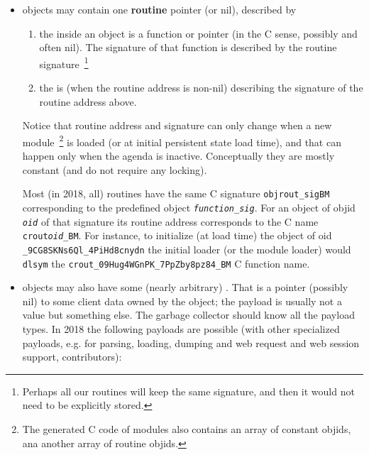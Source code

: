 \begin{itemize}
      \item objects may contain one \textbf{routine} pointer (or nil),
        described by \begin{enumerate}
          
        \item the 
          inside an object is a function or 
          pointer (in the C sense, possibly and often nil). The
          signature of that function is described by the routine
          signature~\footnote{Perhaps all our routines will keep the
            same signature, and then it would not need to be
            explicitly stored.}

        \item the 
          is (when the routine address is non-nil) describing the
          signature of the routine address above.
      \end{enumerate}

      Notice that routine address and signature can only change when
      a new module~\footnote{The generated C code of modules also
        contains an array of constant objids, ana another array of
        routine objids.} is loaded (or at initial persistent state load
      time), and that can happen only when the agenda is
      inactive. Conceptually they are mostly constant (and do not
      require any locking).
        
      Most (in 2018, all) routines have the same C signature
      \texttt{objrout\_sigBM} corresponding to the predefined object
      \texttt{\emph{function\_sig}}. For an object of objid
      \texttt{\emph{oid}} of that signature its routine address
      corresponds to the C name \texttt{crout\emph{oid}\_BM}. For
      instance, to initialize (at load time) the object of oid
      \texttt{\_9CG8SKNs6Ql\_4PiHd8cnydn} the initial loader (or the
      module loader) would \texttt{dlsym} the
      \texttt{crout\_09Hug4WGnPK\_7PpZby8pz84\_BM} C function name.


      \item objects may also have some (nearly arbitrary)
        . That is a pointer (possibly
        nil) to some client data owned by the object; the payload is
        usually not a value but something else. The garbage collector
        should know all the payload types. In 2018 the following
        payloads are possible (with other specialized payloads,
        e.g. for parsing, loading, dumping and web request and web
        session support, contributors):


\end{itemize}
